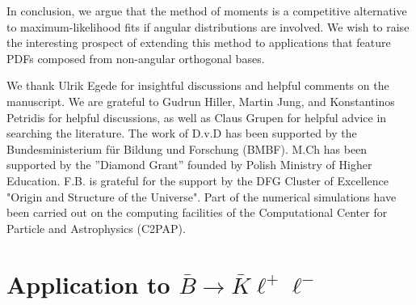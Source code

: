 \documentclass[aps,nofootinbib,preprintnumbers,prd,twocolumn]{revtex4-1}
\begin{document}
In conclusion, we argue that the method of moments is a competitive alternative to
maximum-likelihood fits if angular distributions are involved. We wish to raise
the interesting prospect of extending this method to applications that feature
PDFs composed from non-angular orthogonal bases.

\acknowledgments

We thank Ulrik Egede for insightful discussions and helpful comments
on the manuscript. We are grateful to Gudrun Hiller, Martin Jung, and
Konstantinos Petridis for helpful discussions, as well as Claus Grupen
for helpful advice in searching the literature.  The work of D.v.D has
been supported by the Bundesministerium f\"ur Bildung und Forschung
(BMBF). M.Ch has been supported by the ''Diamond Grant'' founded by Polish Ministry of Higher Education. F.B. is grateful for the support by the DFG Cluster of Excellence "Origin and Structure of the Universe". Part of the numerical simulations have been carried out on the computing facilities of the Computational Center for Particle and Astrophysics
(C2PAP).

\appendix

\section{Application to $\bar{B}\to\bar{K}\ell^+\ell^-$}
\label{app:btokll}
\end{document}
